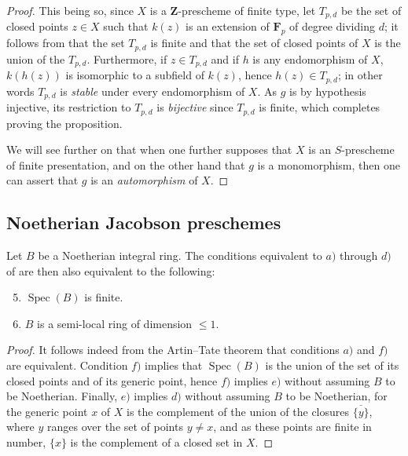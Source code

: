 \begin{proof}
This being so, since $X$ is a $\mathbf{Z}$-prescheme of finite type, let $T_{p,d}$ be the set of closed points $z\in X$ such that $k(z)$ is an extension of $\mathbf{F}_p$ of degree dividing $d$; it follows from  that the set $T_{p,d}$ is finite and that the set of closed points of $X$ is the union of the $T_{p,d}$.
Furthermore, if $z\in T_{p,d}$ and if $h$ is any endomorphism of $X$, $k(h(z))$ is isomorphic to a subfield of $k(z)$, hence $h(z)\in T_{p,d}$; in other words $T_{p,d}$ is \emph{stable} under every endomorphism of $X$.
As $g$ is by hypothesis injective, its restriction to $T_{p,d}$ is \emph{bijective} since $T_{p,d}$ is finite, which completes proving the proposition.

We will see further on  that when one further supposes that $X$ is an $S$-prescheme of finite presentation, and on the other hand that $g$ is a monomorphism, then one can assert that $g$ is an \emph{automorphism} of $X$.
\end{proof}

\subsection{Noetherian Jacobson preschemes}
\label{subsection:IV.10.5}

\begin{proposition}[10.5.1]
\label{IV.10.5.1}
Let $B$ be a Noetherian integral ring.
The conditions equivalent to $a)$ through $d)$ of  are then also equivalent to the following:
\begin{enumerate}[label=\emph{\alph*)}]
  \setcounter{enumi}{4}
  \item $\operatorname{Spec}(B)$ is finite.
  \item $B$ is a semi-local ring of dimension $\leq 1$.
\end{enumerate}
\end{proposition}

\begin{proof}
It follows indeed from the Artin--Tate theorem  that conditions $a)$ and $f)$ are equivalent.
Condition $f)$ implies that $\operatorname{Spec}(B)$ is the union of the set of its closed points and of its generic point, hence $f)$ implies $e)$ without assuming $B$ to be Noetherian.
Finally, $e)$ implies $d)$ without assuming $B$ to be Noetherian, for the generic point $x$ of $X$ is the complement of the union of the closures $\overline{\{y\}}$, where $y$ ranges over the set of points $y\neq x$, and as these points are finite in number, $\{x\}$ is the complement of a closed set in $X$.
\end{proof}

